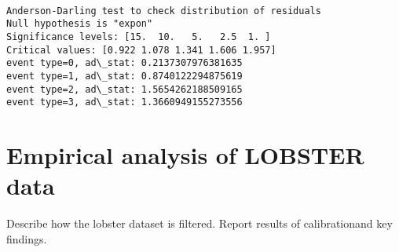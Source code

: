 \documentclass[10pt]{article}
\begin{document}
    \begin{center}
    \end{center}
    { \hspace*{\fill} \\}
    
    \begin{Verbatim}[commandchars=\\\{\}, fontsize=\small]
Anderson-Darling test to check distribution of residuals
Null hypothesis is "expon"
Significance levels: [15.  10.   5.   2.5  1. ]
Critical values: [0.922 1.078 1.341 1.606 1.957]
event type=0, ad\_stat: 0.2137307976381635
event type=1, ad\_stat: 0.8740122294875619
event type=2, ad\_stat: 1.5654262188509165
event type=3, ad\_stat: 1.3660949155273556
    \end{Verbatim}


\section{Empirical analysis of LOBSTER data}
Describe how the lobster dataset is filtered. Report results of calibrationand key findings. 


    


    
\end{document}
